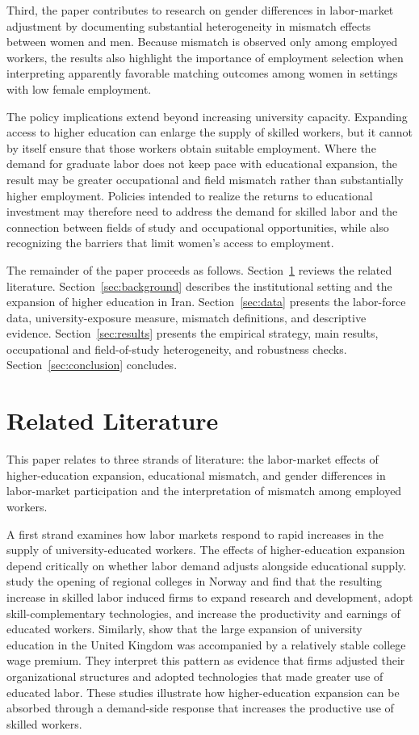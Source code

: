 Third, the paper contributes to research on gender differences in labor-market adjustment by documenting substantial heterogeneity in mismatch effects between women and men. Because mismatch is observed only among employed workers, the results also highlight the importance of employment selection when interpreting apparently favorable matching outcomes among women in settings with low female employment.

The policy implications extend beyond increasing university capacity. Expanding access to higher education can enlarge the supply of skilled workers, but it cannot by itself ensure that those workers obtain suitable employment. Where the demand for graduate labor does not keep pace with educational expansion, the result may be greater occupational and field mismatch rather than substantially higher employment. Policies intended to realize the returns to educational investment may therefore need to address the demand for skilled labor and the connection between fields of study and occupational opportunities, while also recognizing the barriers that limit women's access to employment.

The remainder of the paper proceeds as follows. Section~\ref{sec:literature} reviews the related literature. Section~\ref{sec:background} describes the institutional setting and the expansion of higher education in Iran. Section~\ref{sec:data} presents the labor-force data, university-exposure measure, mismatch definitions, and descriptive evidence. Section~\ref{sec:results} presents the empirical strategy, main results, occupational and field-of-study heterogeneity, and robustness checks. Section~\ref{sec:conclusion} concludes.

\section{Related Literature}
\label{sec:literature}

This paper relates to three strands of literature: the labor-market effects of higher-education expansion, educational mismatch, and gender differences in labor-market participation and the interpretation of mismatch among employed workers.

A first strand examines how labor markets respond to rapid increases in the supply of university-educated workers. The effects of higher-education expansion depend critically on whether labor demand adjusts alongside educational supply. \citet{carneiro2023} study the opening of regional colleges in Norway and find that the resulting increase in skilled labor induced firms to expand research and development, adopt skill-complementary technologies, and increase the productivity and earnings of educated workers. Similarly, \citet{blundell2022} show that the large expansion of university education in the United Kingdom was accompanied by a relatively stable college wage premium. They interpret this pattern as evidence that firms adjusted their organizational structures and adopted technologies that made greater use of educated labor. These studies illustrate how higher-education expansion can be absorbed through a demand-side response that increases the productive use of skilled workers.

